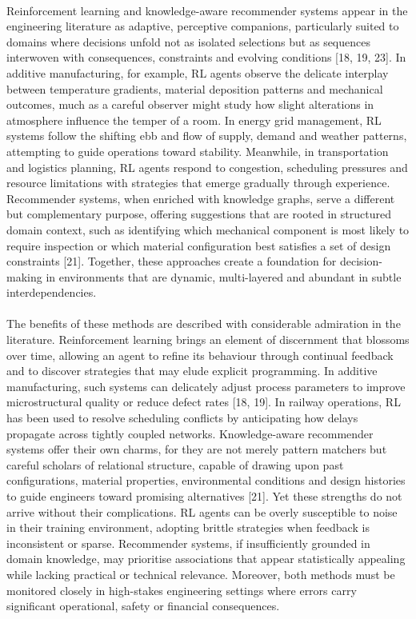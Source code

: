         \paragraph{}
        Reinforcement learning and knowledge-aware recommender systems appear in the engineering literature as adaptive, perceptive companions, particularly suited to domains where decisions unfold not as isolated selections but as sequences interwoven with consequences, constraints and evolving conditions [18, 19, 23]. In additive manufacturing, for example, RL agents observe the delicate interplay between temperature gradients, material deposition patterns and mechanical outcomes, much as a careful observer might study how slight alterations in atmosphere influence the temper of a room. In energy grid management, RL systems follow the shifting ebb and flow of supply, demand and weather patterns, attempting to guide operations toward stability. Meanwhile, in transportation and logistics planning, RL agents respond to congestion, scheduling pressures and resource limitations with strategies that emerge gradually through experience. Recommender systems, when enriched with knowledge graphs, serve a different but complementary purpose, offering suggestions that are rooted in structured domain context, such as identifying which mechanical component is most likely to require inspection or which material configuration best satisfies a set of design constraints [21]. Together, these approaches create a foundation for decision-making in environments that are dynamic, multi-layered and abundant in subtle interdependencies.

        \newpage
        \paragraph{}
        The benefits of these methods are described with considerable admiration in the literature. Reinforcement learning brings an element of discernment that blossoms over time, allowing an agent to refine its behaviour through continual feedback and to discover strategies that may elude explicit programming. In additive manufacturing, such systems can delicately adjust process parameters to improve microstructural quality or reduce defect rates [18, 19]. In railway operations, RL has been used to resolve scheduling conflicts by anticipating how delays propagate across tightly coupled networks. Knowledge-aware recommender systems offer their own charms, for they are not merely pattern matchers but careful scholars of relational structure, capable of drawing upon past configurations, material properties, environmental conditions and design histories to guide engineers toward promising alternatives [21]. Yet these strengths do not arrive without their complications. RL agents can be overly susceptible to noise in their training environment, adopting brittle strategies when feedback is inconsistent or sparse. Recommender systems, if insufficiently grounded in domain knowledge, may prioritise associations that appear statistically appealing while lacking practical or technical relevance. Moreover, both methods must be monitored closely in high-stakes engineering settings where errors carry significant operational, safety or financial consequences.

